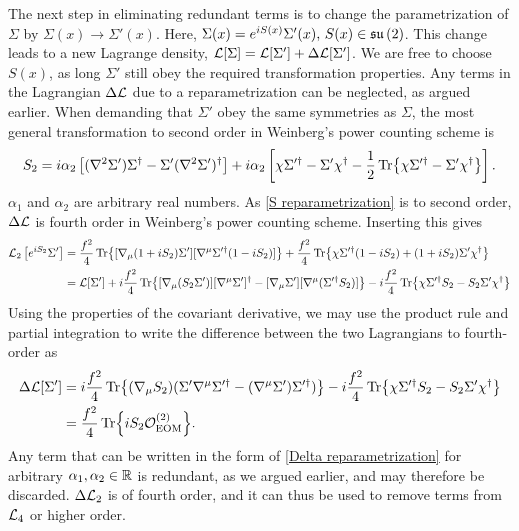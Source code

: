 The next step in eliminating redundant terms is to change the parametrization of $\Sigma$ by $\Sigma(x) \rightarrow \Sigma'(x)$.
Here, $ \Sigma(x) = e^{iS(x)} \Sigma'(x), \, S(x) \in \mathfrak{su}\left(2\right)$. This change leads to a new Lagrange density, $\mathcal{L}[\Sigma] = \mathcal{L}[\Sigma'] + \Delta \mathcal{L}[\Sigma']$.
We are free to choose $S(x)$, as long $\Sigma'$ still obey the required transformation properties.
Any terms in the Lagrangian $\Delta \mathcal{L}$ due to a reparametrization can be neglected, as argued earlier.
When demanding that $\Sigma'$ obey the same symmetries as $\Sigma$,
the most general transformation to second order in Weinberg's power counting scheme  is~\cite{Scherer2002IntroductionTC}
\begin{equation}
    \label{S reparametrization}
    S_{2} = 
    i \alpha_2 
    \left[
        (\nabla^2 \Sigma') \Sigma^\dagger - \Sigma' (\nabla^2 {\Sigma'})^\dagger
    \right]
    + i \alpha_2
    \left[
        \chi \Sigma'^\dagger - \Sigma' \chi^\dagger 
        - \frac{1}{2} \Tr{\chi \Sigma'^\dagger - \Sigma' \chi^\dagger}
    \right].
\end{equation}
$\alpha_1$ and $\alpha_2$ are arbitrary real numbers. As \cref{S reparametrization} is to second order, $\Delta \mathcal{L}$ is fourth order in Weinberg's power counting scheme.
Inserting this gives
\begin{align*}
    \mathcal{L}_2\left[e^{i S_2}\Sigma '\right]
    & =
    \frac{f^2}{4}\Tr{[\nabla_\mu (1 +i S_2)\Sigma'][\nabla^\mu \Sigma'^\dagger  (1 - i S_2)]}
    + \frac{f^2}{4} \Tr{\chi\Sigma'^\dagger (1 - i S_2) + (1 +i S_2)\Sigma' \chi^\dagger} \\
    & = \mathcal{L}[\Sigma'] + 
    i \frac{f^2}{4}
    \Tr{[\nabla_\mu (S_2\Sigma')][\nabla^\mu\Sigma']^\dagger 
    -  [\nabla_\mu\Sigma'][\nabla^\mu (\Sigma'^\dagger  S_2) ]}
    - i \frac{f^2}{4} \Tr{\chi \Sigma'^\dagger S_2 - S_2 \Sigma' \chi^\dagger}
\end{align*}
Using the properties of the covariant derivative, we may use the product rule and partial integration to write the difference between the two Lagrangians to fourth-order as
\begin{align}
    \nonumber
    \Delta \mathcal{L}[\Sigma'] 
    & = 
    i \frac{f^2}{4}
    \Tr{
        (\nabla_\mu S_2)
        (\Sigma' \nabla^\mu \Sigma'^\dagger - (\nabla^\mu \Sigma') \Sigma'^\dagger) 
    }
    - i \frac{f^2}{4} \Tr{\chi \Sigma'^\dagger  S_2 - S_2 \Sigma' \chi^\dagger} \\
    & = 
    \label{Delta reparametrization}
    \frac{f^2}{4} \Tr{i S_2 \mathcal{O}_\mathrm{EOM}^{(2)}}.
\end{align}
Any term that can be written in the form of \cref{Delta reparametrization} for arbitrary $\alpha_1, \alpha_2 \in \mathbb{R}$ is redundant, as we argued earlier, and may therefore be discarded.
$\Delta \mathcal{L}_2$ is of fourth order, and it can thus be used to remove terms from $\mathcal{L}_4$ or higher order.


